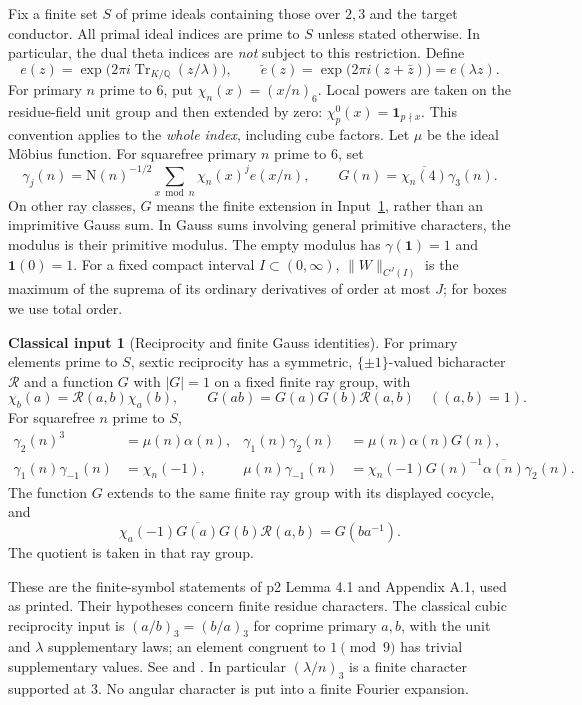 \documentclass[11pt,a4paper]{article}
\numberwithin{equation}{section}
\theoremstyle{definition}
\newtheorem{inputthm}[theorem]{Classical input}
\theoremstyle{remark}
\newcommand{\Q}{\mathbb Q}
\newcommand{\N}{\mathrm N}
\newcommand{\ind}{\mathbf 1}
\newcommand{\ve}{\breve e}
\begin{document}
Fix a finite set $S$ of prime ideals containing those over $2,3$ and the target conductor. All primal ideal indices are prime to $S$ unless stated otherwise. In particular, the dual theta indices are \emph{not} subject to this restriction. Define
\[
 e(z)=\exp\bigl(2\pi i\operatorname{Tr}_{K/\Q}(z/\lambda)\bigr),\qquad
 \ve(z)=\exp\bigl(2\pi i(z+\bar z)\bigr)=e(\lambda z).
\]
For primary $n$ prime to $6$, put $\chi_n(x)=(x/n)_6$. Local powers are taken on the residue-field unit group and then extended by zero: $\chi_p^0(x)=\ind_{p\nmid x}$. This convention applies to the \emph{whole index}, including cube factors. Let $\mu$ be the ideal M\"obius function. For squarefree primary $n$ prime to $6$, set
\[
 \gamma_j(n)=\N(n)^{-1/2}\sum_{x\bmod n}\chi_n(x)^j e(x/n),\qquad
 G(n)=\overline{\chi_n(4)}\gamma_3(n).
\]
On other ray classes, $G$ means the finite extension in Input~\ref{inp:gauss}, rather than an imprimitive Gauss sum. In Gauss sums involving general primitive characters, the modulus is their primitive modulus. The empty modulus has $\gamma(\mathbf1)=1$ and $\mathbf1(0)=1$. For a fixed compact interval $I\subset(0,\infty)$, $\|W\|_{C^J(I)}$ is the maximum of the suprema of its ordinary derivatives of order at most $J$; for boxes we use total order.

\begin{inputthm}[Reciprocity and finite Gauss identities]\label{inp:gauss}
For primary elements prime to $S$, sextic reciprocity has a symmetric, $\{\pm1\}$-valued bicharacter $\mathcal R$ and a function $G$ with $|G|=1$ on a fixed finite ray group, with
\[
 \chi_b(a)=\mathcal R(a,b)\chi_a(b),\qquad
 G(ab)=G(a)G(b)\mathcal R(a,b)\quad((a,b)=1).
\]
For squarefree $n$ prime to $S$,
\begin{align}\label{eq:gauss}
 \gamma_2(n)^3&=\mu(n)\alpha(n),&
 \gamma_1(n)\gamma_2(n)&=\mu(n)\alpha(n)G(n),\\
 \gamma_1(n)\gamma_{-1}(n)&=\chi_n(-1),&
 \mu(n)\gamma_{-1}(n)&=\chi_n(-1)G(n)^{-1}\overline{\alpha(n)}\gamma_2(n).\label{eq:convert}
\end{align}
The function $G$ extends to the same finite ray group with its displayed cocycle, and
\[
 \chi_a(-1)\overline{G(a)}G(b)\mathcal R(a,b)=G(ba^{-1}).
\]
The quotient is taken in that ray group.
\end{inputthm}
These are the finite-symbol statements of p2 Lemma 4.1 and Appendix A.1, used as printed. Their hypotheses concern finite residue characters. The classical cubic reciprocity input is $(a/b)_3=(b/a)_3$ for coprime primary $a,b$, with the unit and $\lambda$ supplementary laws; an element congruent to $1\pmod9$ has trivial supplementary values. See \cite{Kubota} and \cite[(1.4)--(1.5), Section 2]{DR}. In particular $(\lambda/n)_3$ is a finite character supported at $3$. No angular character is put into a finite Fourier expansion.
\end{document}
